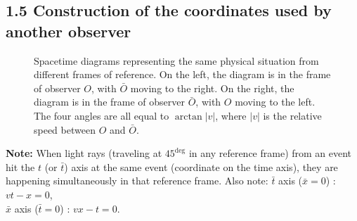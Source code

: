 \documentclass[11pt,letterpaper]{book}
\begin{document}
    \subsection{1.5 Construction of the coordinates used by another observer}
    \begin{figure}[h!]
        \centering
        \caption{Spacetime diagrams representing the same physical situation from different frames of reference. On the left, the diagram is in the frame of observer \(O\), with \(\bar{O}\) moving to the right. On the right, the diagram is in the frame of observer \(\bar{O}\), with \(O\) moving to the left. The four angles are all equal to \(\arctan{|v|}\), where \(|v|\) is the relative speed between \(O\) and \(\bar{O}\).}
        \end{figure}

        \textbf{Note:} When light rays (traveling at \(45^{\deg}\) in any reference frame) from an event hit the \(t\) (or \(\bar{t}\)) axis at the same event (coordinate on the time axis), they are happening simultaneously in that reference frame. Also note:
        \(\bar{t}\) axis (\(\bar{x} = 0\)) : \( vt - x = 0 \),\\
        \(\bar{x}\) axis (\(\bar{t} = 0\)) : \( vx - t = 0 \).
        
\end{document}
